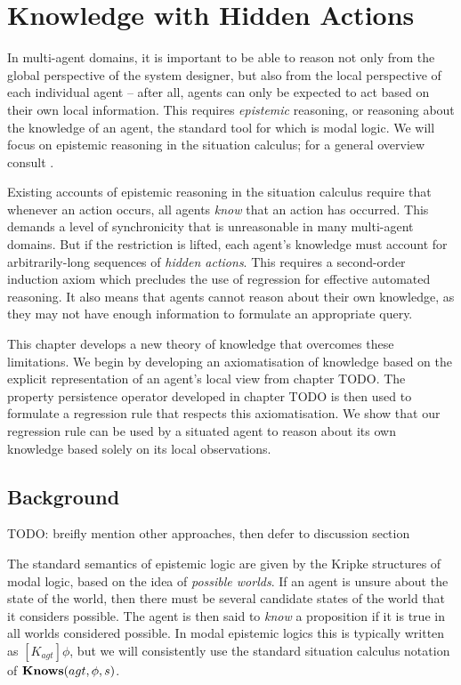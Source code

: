 

\chapter{Knowledge with Hidden Actions}

\label{ch:knowledge}

In multi-agent domains, it is important to be able to reason not only
from the global perspective of the system designer, but also from
the local perspective of each individual agent -- after all, agents
can only be expected to act based on their own local information.
This requires \emph{epistemic} reasoning, or reasoning about the knowledge
of an agent, the standard tool for which is modal logic. We will focus
on epistemic reasoning in the situation calculus; for a general overview
consult \citep{fagin95}.

Existing accounts of epistemic reasoning in the situation calculus
require that whenever an action occurs, all agents \emph{know} that
an action has occurred. This demands a level of synchronicity that
is unreasonable in many multi-agent domains. But if the restriction
is lifted, each agent's knowledge must account for arbitrarily-long
sequences of \emph{hidden actions}. This requires a second-order induction
axiom which precludes the use of regression for effective automated
reasoning. It also means that agents cannot reason about their own
knowledge, as they may not have enough information to formulate an
appropriate query.

This chapter develops a new theory of knowledge that overcomes these
limitations. We begin by developing an axiomatisation of knowledge
based on the explicit representation of an agent's local view from
chapter TODO. The property persistence operator developed in chapter
TODO is then used to formulate a regression rule that respects this
axiomatisation. We show that our regression rule can be used by a
situated agent to reason about its own knowledge based solely on its
local observations.


\section{Background}

TODO: breifly mention other approaches, then defer to discussion section

The standard semantics of epistemic logic are given by the Kripke
structures of modal logic, based on the idea of \emph{possible worlds}.
If an agent is unsure about the state of the world, then there must
be several candidate states of the world that it considers possible.
The agent is then said to \emph{know} a proposition if it is true
in all worlds considered possible. In modal epistemic logics this
is typically written as $[K_{agt}]\phi$, but we will consistently
use the standard situation calculus notation of $\mathbf{Knows}(agt,\phi,s)$.

